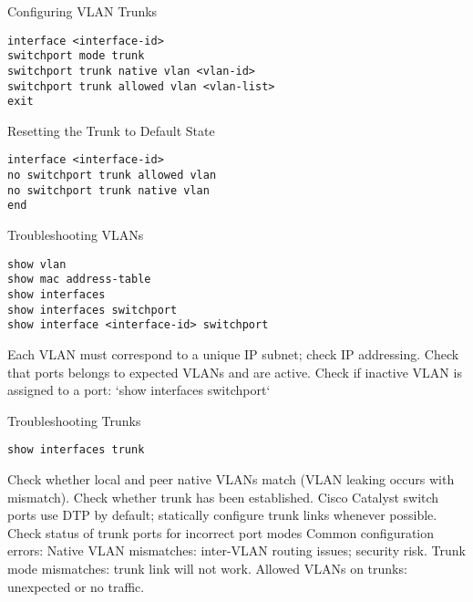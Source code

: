 \documentclass[../EngineeringJournal_CDavis.tex]{subfiles}
\begin{document}
\hspace{0.2cm}
\begin{tcolorbox}[width=6.3in]
Configuring VLAN Trunks
\scriptsize 
\begin{verbatim}
interface <interface-id>
switchport mode trunk
switchport trunk native vlan <vlan-id>
switchport trunk allowed vlan <vlan-list>
exit
\end{verbatim}
\normalsize
Resetting the Trunk to Default State
\scriptsize
\begin{verbatim}
interface <interface-id>
no switchport trunk allowed vlan
no switchport trunk native vlan
end
\end{verbatim}
\normalsize
Troubleshooting VLANs
\scriptsize
\begin{verbatim}
show vlan
show mac address-table
show interfaces
show interfaces switchport
show interface <interface-id> switchport
\end{verbatim}
\begin{outline}
\1 Each VLAN must correspond to a unique IP subnet; check IP addressing.
\1 Check that ports belongs to expected VLANs and are active.
\1 Check if inactive VLAN is assigned to a port: `show interfaces switchport`
\end{outline}
\end{tcolorbox}
\hspace{0.2cm}
\normalsize  



\hspace{0.2cm}
\begin{tcolorbox}[width=6.3in]
Troubleshooting Trunks
\scriptsize 
\begin{verbatim}
show interfaces trunk
\end{verbatim}
\begin{outline}
\1 Check whether local and peer native VLANs match (VLAN leaking occurs with mismatch).
\1 Check whether trunk has been established. Cisco Catalyst switch ports use DTP by default; statically configure trunk links whenever possible.
\1 Check status of trunk ports for incorrect port modes
\1 Common configuration errors:
\1 Native VLAN mismatches: inter-VLAN routing issues; security risk.
\1 Trunk mode mismatches: trunk link will not work.
\1 Allowed VLANs on trunks: unexpected or no traffic.
\end{outline}
\end{tcolorbox}
\hspace{0.2cm}
\normalsize  

\end{document}
